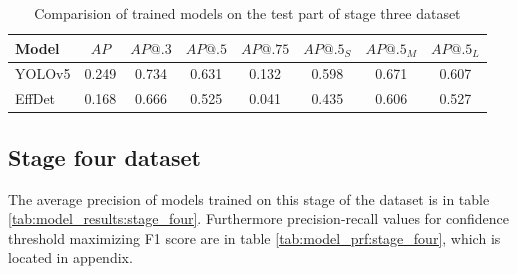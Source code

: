 \begin{table}[H]
    \centering
    \begin{tabular}{|l|c|c|c|c|c|c|c|}
        \hline
        Model  & $AP$  & $AP@.3$ & $AP@.5$ & $AP@.75$ & $AP@.5_S$ & $AP@.5_M$ & $AP@.5_L$ \\ \hline
        YOLOv5 & 0.249 & 0.734   & 0.631   & 0.132    & 0.598     & 0.671     & 0.607     \\ \hline
        EffDet & 0.168 & 0.666   & 0.525   & 0.041    & 0.435     & 0.606     & 0.527     \\ \hline
    \end{tabular}
    \caption{Comparision of trained models on the test part of stage three dataset}
    \label{tab:model_results:stage_three:test}
\end{table}


\subsection{Stage four dataset}
The average precision of models trained on this stage of the dataset is in table \ref{tab:model_results:stage_four}. Furthermore precision-recall values for confidence threshold maximizing F1 score are in table \ref{tab:model_prf:stage_four}, which is located in appendix.

